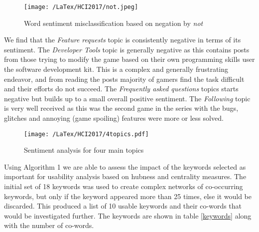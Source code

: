 \documentclass{ewic}
\begin{document}
\begin{figure}[h]
  \begin{center}
\texttt{[image: /LaTex/HCI2017/not.jpeg]} %
  \end{center}
 \caption{Word sentiment misclassification based on negation by {\it not}}
\label{not}
\end{figure}


We find that the {\it Feature requests} topic is consistently negative in terms of its sentiment. The {\it Developer Tools} topic is generally negative as this contains posts from those trying to modify the game based on their own programming skills user the software development kit. This is a complex and generally frustrating endeavor, and from reading the posts majority of gamers find the task difficult and their efforts do not succeed. The {\it Frequently asked questions} topics starts negative but builds up to a small overall positive sentiment. The {\it Following} topic is very well received as this was the second game in the series with the bugs, glitches and annoying (game spoiling) features were more or less solved.

\begin{figure*}[ht]
  \begin{center}
 \texttt{[image: /LaTex/HCI2017/4topics.pdf]} %
  \end{center}
 \caption{Sentiment analysis for four main topics}
\label{sentiment1}
\end{figure*}

Using Algorithm 1 we are able to assess the impact of the keywords selected as important for usability analysis based on hubness and centrality measures. The initial set of 18 keywords was used to create complex networks of co-occurring keywords, but only if the keyword appeared more than 25 times, else it would be discarded. This produced a list of 10 usable keywords and their co-words that would be investigated further. The keywords are shown in table \ref{keywords} along with the number of co-words. 
\end{document}
